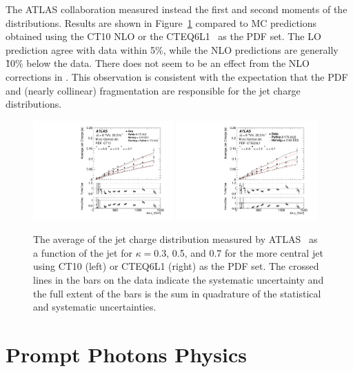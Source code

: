 \documentclass{PoS}
\begin{document}
The ATLAS collaboration measured instead the first and second moments of the
distributions. Results are shown in Figure~\ref{fig:jetcharge}
compared to MC predictions obtained using the CT10 NLO or the 
CTEQ6L1~\cite{Pumplin:2002vw} as the PDF set. The LO prediction agree with data within 5\%, while the NLO predictions are generally
\~10\% below the data. There does not seem to be an effect from the NLO corrections in \POWHEG.   
This observation is consistent with the expectation that the PDF and (nearly collinear) fragmentation
are responsible for the jet charge distributions.    
\begin{figure}[hbtp]
  \centering
  \includegraphics[width=0.48\textwidth]{Figure10a.pdf}
  \includegraphics[width=0.48\textwidth]{Figure10b.pdf}
  \caption{The average of the jet charge distribution measured by
    ATLAS~\cite{Aad:2015cua} as a function of the jet
    \pt for $\kappa=$0.3, 0.5, and 0.7 for the more central jet using CT10 (left) or CTEQ6L1 (right) as the PDF set. The crossed lines in the
    bars on the data indicate the systematic uncertainty and the full extent of the bars is the sum in quadrature of the
    statistical and systematic uncertainties. } 
  \label{fig:jetcharge}
\end{figure}


\section{Prompt Photons Physics}
\end{document}
